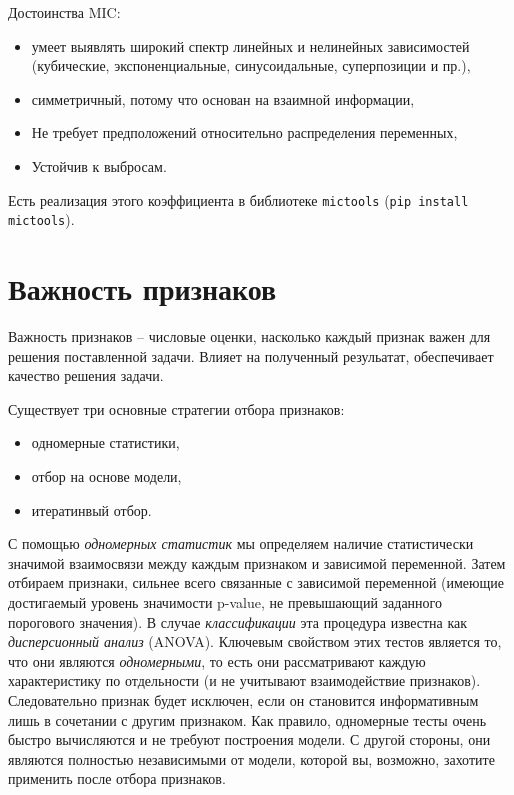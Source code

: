 \documentclass[%
	11pt,
	a4paper,
	utf8,
		]{article}
\begin{document}
Достоинства MIC:
\begin{itemize}
	\item умеет выявлять широкий спектр линейных и нелинейных зависимостей (кубические, экспоненциальные, синусоидальные, суперпозиции и пр.),
	
	\item симметричный, потому что основан на взаимной информации,
	
	\item Не требует предположений относительно распределения переменных,
	
	\item Устойчив к выбросам.
\end{itemize}

Есть реализация этого коэффициента в библиотеке \texttt{mictools} (\verb|pip install mictools|).


\section{Важность признаков}

Важность признаков -- числовые оценки, насколько каждый признак важен для решения поставленной задачи. Влияет на полученный резульатат, обеспечивает качество решения задачи.

Существует три основные стратегии отбора признаков:
\begin{itemize}
	\item одномерные статистики,
	
	\item отбор на основе модели,
	
	\item итератинвый отбор.
\end{itemize}

С помощью \emph{одномерных статистик} мы определяем наличие статистически значимой взаимосвязи между каждым признаком и зависимой переменной. Затем отбираем признаки, сильнее всего связанные с зависимой переменной (имеющие достигаемый уровень значимости p-value, не превышающий заданного порогового значения). В случае \emph{классификации} эта процедура известна как \emph{дисперсионный анализ} (ANOVA). Ключевым свойством этих тестов является то, что они являются \emph{одномерными}, то есть они рассматривают каждую характеристику по отдельности (и не учитывают взаимодействие признаков). Следовательно признак будет исключен, если он становится информативным лишь в сочетании с другим признаком. Как правило, одномерные тесты очень быстро вычисляются и не требуют построения модели. С другой стороны, они являются полностью независимыми от модели, которой вы, возможно, захотите применить после отбора признаков.
\end{document}
